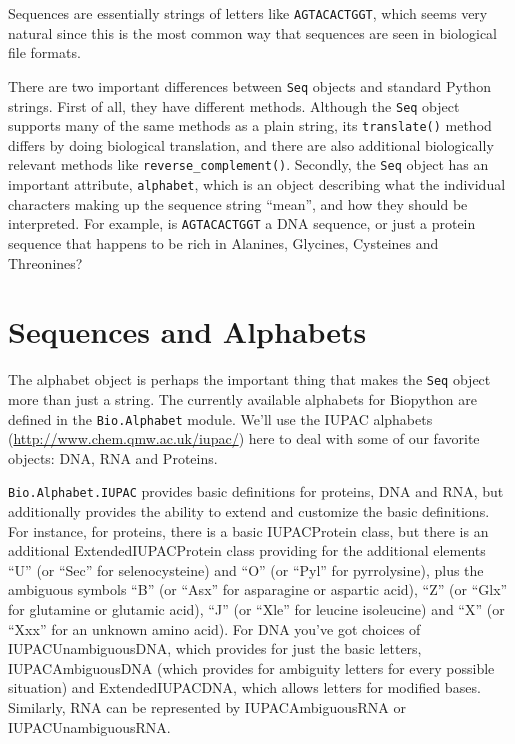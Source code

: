 \documentclass{report}
\begin{document}
Sequences are essentially strings of letters like \verb|AGTACACTGGT|, which seems very natural since this is the most common way that sequences are seen in biological file formats.

There are two important differences between \verb|Seq| objects and standard Python strings.
First of all, they have different methods.  Although the \verb|Seq| object supports many of the same methods as a plain string, its \verb|translate()| method differs by doing biological translation, and there are also additional biologically relevant methods like \verb|reverse_complement()|.
Secondly, the \verb|Seq| object has an important attribute, \verb|alphabet|, which is an object describing what the individual characters making up the sequence string ``mean'', and how they should be interpreted.  For example, is \verb|AGTACACTGGT| a DNA sequence, or just a protein sequence that happens to be rich in Alanines, Glycines, Cysteines
and Threonines?

\section{Sequences and Alphabets}

The alphabet object is perhaps the important thing that makes the \verb|Seq| object more than just a string. The currently available alphabets for Biopython are defined in the \verb|Bio.Alphabet| module. We'll use the IUPAC alphabets (\url{http://www.chem.qmw.ac.uk/iupac/}) here to deal with some of our favorite objects: DNA, RNA and Proteins.

\verb|Bio.Alphabet.IUPAC| provides basic definitions for proteins, DNA and RNA, but additionally provides the ability to extend and customize the basic definitions. For instance, for proteins, there is a basic IUPACProtein class, but there is an additional ExtendedIUPACProtein class providing for the additional elements ``U'' (or ``Sec'' for selenocysteine) and ``O'' (or ``Pyl'' for pyrrolysine), plus the ambiguous symbols ``B'' (or ``Asx'' for asparagine or aspartic acid), ``Z'' (or ``Glx'' for glutamine or glutamic acid), ``J'' (or ``Xle'' for leucine isoleucine) and ``X'' (or ``Xxx'' for an unknown amino acid). For DNA you've got choices of IUPACUnambiguousDNA, which provides for just the basic letters, IUPACAmbiguousDNA (which provides for ambiguity letters for every possible situation) and ExtendedIUPACDNA, which allows letters for modified bases. Similarly, RNA can be represented by IUPACAmbiguousRNA or IUPACUnambiguousRNA.
\end{document}
